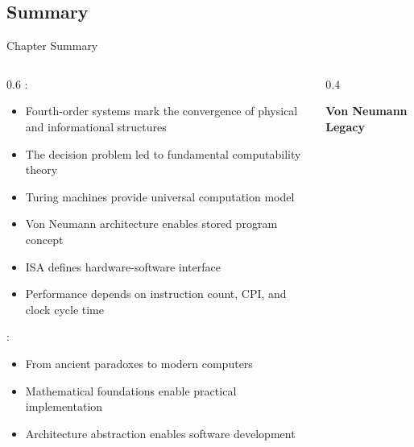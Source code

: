 \subsection{Summary}

\begin{frame}{Chapter Summary}
\begin{columns}
\begin{column}{0.6\textwidth}
:
\begin{itemize}
\item Fourth-order systems mark the convergence of physical and informational structures
\item The decision problem led to fundamental computability theory
\item Turing machines provide universal computation model
\item Von Neumann architecture enables stored program concept
\item ISA defines hardware-software interface
\item Performance depends on instruction count, CPI, and clock cycle time
\end{itemize}

\vspace{0.3cm}
:
\begin{itemize}
\item From ancient paradoxes to modern computers
\item Mathematical foundations enable practical implementation
\item Architecture abstraction enables software development
\end{itemize}
\end{column}
\begin{column}{0.4\textwidth}
\begin{center}
\textbf{Von Neumann Legacy}
\vspace{0.3cm}

\end{center}
\end{column}
\end{columns}
\end{frame}

